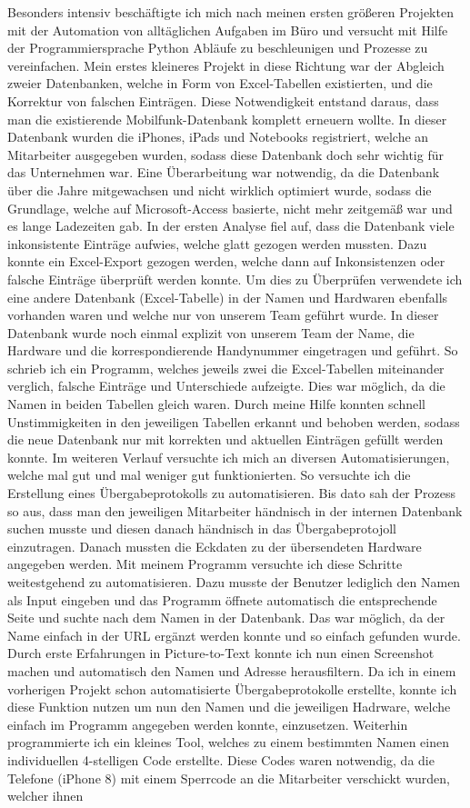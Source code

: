 Besonders intensiv beschäftigte ich mich nach meinen ersten größeren Projekten mit der Automation von alltäglichen Aufgaben im Büro und versucht mit Hilfe der Programmiersprache Python Abläufe zu beschleunigen und Prozesse zu vereinfachen. 
Mein erstes kleineres Projekt in diese Richtung war der Abgleich zweier Datenbanken, welche in Form von Excel-Tabellen existierten, und die Korrektur von falschen Einträgen. Diese Notwendigkeit entstand daraus, dass man die existierende Mobilfunk-Datenbank komplett erneuern wollte. In dieser Datenbank wurden die iPhones, iPads und Notebooks registriert, welche an Mitarbeiter ausgegeben wurden, sodass diese Datenbank doch sehr wichtig für das Unternehmen war. Eine Überarbeitung war notwendig, da die Datenbank über die Jahre mitgewachsen und nicht wirklich optimiert wurde, sodass die Grundlage, welche auf Microsoft-Access basierte, nicht mehr zeitgemäß war und es lange Ladezeiten gab. In der ersten Analyse fiel auf, dass die Datenbank viele inkonsistente Einträge aufwies, welche glatt gezogen werden mussten. Dazu konnte ein Excel-Export gezogen werden, welche dann auf Inkonsistenzen oder falsche Einträge überprüft werden konnte. Um dies zu Überprüfen verwendete ich eine andere Datenbank (Excel-Tabelle) in der Namen und Hardwaren ebenfalls vorhanden waren und welche nur von unserem Team geführt wurde. In dieser Datenbank wurde noch einmal explizit von unserem Team der Name, die Hardware und die korrespondierende Handynummer eingetragen und geführt. So schrieb ich ein Programm, welches jeweils zwei die Excel-Tabellen miteinander verglich, falsche Einträge und Unterschiede aufzeigte. Dies war möglich, da die Namen in beiden Tabellen gleich waren. Durch meine Hilfe konnten schnell Unstimmigkeiten in den jeweiligen Tabellen erkannt und behoben werden, sodass die neue Datenbank nur mit korrekten und aktuellen Einträgen gefüllt werden konnte. Im weiteren Verlauf versuchte ich mich an diversen Automatisierungen, welche mal gut und mal weniger gut funktionierten. So versuchte ich die Erstellung eines Übergabeprotokolls zu automatisieren. Bis dato sah der Prozess so aus, dass man den jeweiligen Mitarbeiter händnisch in der internen Datenbank suchen musste und diesen danach händnisch in das Übergabeprotojoll einzutragen. Danach mussten die Eckdaten zu der übersendeten Hardware angegeben werden. Mit meinem Programm versuchte ich diese Schritte weitestgehend zu automatisieren. Dazu musste der Benutzer lediglich den Namen als Input eingeben und das Programm öffnete automatisch die entsprechende Seite und suchte nach dem Namen in der Datenbank. Das war möglich, da der Name einfach in der URL ergänzt werden konnte und so einfach gefunden wurde. Durch erste Erfahrungen in Picture-to-Text konnte ich nun einen Screenshot machen und automatisch den Namen und Adresse herausfiltern. Da ich in einem vorherigen Projekt schon automatisierte Übergabeprotokolle erstellte, konnte ich diese Funktion nutzen um nun den Namen und die jeweiligen Hadrware, welche einfach im Programm angegeben werden konnte, einzusetzen. Weiterhin programmierte ich ein kleines Tool, welches zu einem bestimmten Namen einen individuellen 4-stelligen Code erstellte. Diese Codes waren notwendig, da die Telefone (iPhone 8) mit einem Sperrcode an die Mitarbeiter verschickt wurden, welcher ihnen 